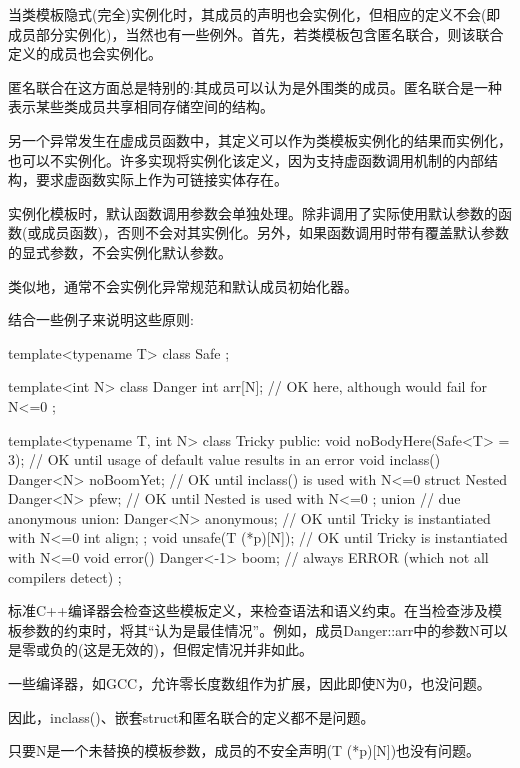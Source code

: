 当类模板隐式(完全)实例化时，其成员的声明也会实例化，但相应的定义不会(即成员部分实例化)，当然也有一些例外。首先，若类模板包含匿名联合，则该联合定义的成员也会实例化。

\begin{notice}匿名联合在这方面总是特别的:其成员可以认为是外围类的成员。匿名联合是一种表示某些类成员共享相同存储空间的结构。
\end{notice}

另一个异常发生在虚成员函数中，其定义可以作为类模板实例化的结果而实例化，也可以不实例化。许多实现将实例化该定义，因为支持虚函数调用机制的内部结构，要求虚函数实际上作为可链接实体存在。 

实例化模板时，默认函数调用参数会单独处理。除非调用了实际使用默认参数的函数(或成员函数)，否则不会对其实例化。另外，如果函数调用时带有覆盖默认参数的显式参数，不会实例化默认参数。

类似地，通常不会实例化异常规范和默认成员初始化器。

结合一些例子来说明这些原则:

\begin{cpp}
template<typename T>
class Safe {
};

template<int N>
class Danger {
	int arr[N]; // OK here, although would fail for N<=0
};

template<typename T, int N>
class Tricky {
	public:
	void noBodyHere(Safe<T> = 3); // OK until usage of default value results in an error
	void inclass() {
		Danger<N> noBoomYet; // OK until inclass() is used with N<=0
	}
	struct Nested {
		Danger<N> pfew; // OK until Nested is used with N<=0
	};
	union { // due anonymous union:
		Danger<N> anonymous; // OK until Tricky is instantiated with N<=0
		int align;
	};
	void unsafe(T (*p)[N]); // OK until Tricky is instantiated with N<=0
	void error() {
		Danger<-1> boom; // always ERROR (which not all compilers detect)
	}
};
\end{cpp}

标准C++编译器会检查这些模板定义，来检查语法和语义约束。在当检查涉及模板参数的约束时，将其“认为是最佳情况”。例如，成员Danger::arr中的参数N可以是零或负的(这是无效的)，但假定情况并非如此。

\begin{notice}一些编译器，如GCC，允许零长度数组作为扩展，因此即使N为0，也没问题。
\end{notice}

因此，inclass()、嵌套struct和匿名联合的定义都不是问题。

只要N是一个未替换的模板参数，成员的不安全声明(T (*p)[N])也没有问题。

